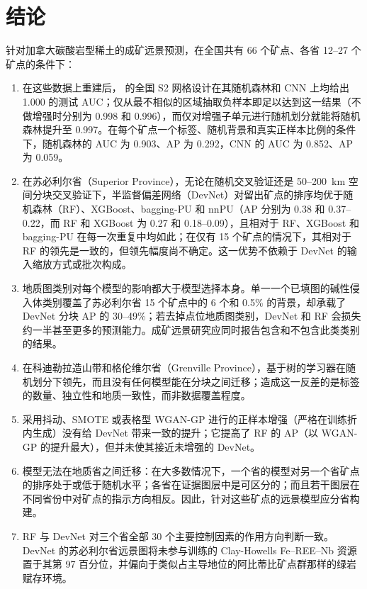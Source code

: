 \documentclass[pdflatex,sn-apa]{sn-jnl}
\begin{document}
\section{结论}\label{sec:conclusions}

针对加拿大碳酸岩型稀土的成矿远景预测，在全国共有 66 个矿点、各省 12--27 个矿点的条件下：
\begin{enumerate}
\item 在这些数据上重建后，\citet{Parsa2024} 的全国 S2 网格设计在其随机森林和 CNN 上均给出 1.000 的测试 AUC；仅从最不相似的区域抽取负样本即足以达到这一结果（不做增强时分别为 0.998 和 0.996），而仅对增强子单元进行随机划分就能将随机森林提升至 0.997。在每个矿点一个标签、随机背景和真实正样本比例的条件下，随机森林的 AUC 为 0.903、AP 为 0.292，CNN 的 AUC 为 0.852、AP 为 0.059。
\item 在苏必利尔省（Superior Province），无论在随机交叉验证还是 50--200~km 空间分块交叉验证下，半监督偏差网络（DevNet）对留出矿点的排序均优于随机森林（RF）、XGBoost、bagging-PU 和 nnPU（AP 分别为 0.38 和 0.37--0.22，而 RF 和 XGBoost 为 0.27 和 0.18--0.09），且相对于 RF、XGBoost 和 bagging-PU 在每一次重复中均如此；在仅有 15 个矿点的情况下，其相对于 RF 的领先是一致的，但领先幅度尚不确定。这一优势不依赖于 DevNet 的输入缩放方式或批次构成。
\item 地质图类别对每个模型的影响都大于模型选择本身。单一一个已填图的碱性侵入体类别覆盖了苏必利尔省 15 个矿点中的 6 个和 0.5\% 的背景，却承载了 DevNet 分块 AP 的 30--49\%；若去掉点位地质图类别，DevNet 和 RF 会损失约一半甚至更多的预测能力。成矿远景研究应同时报告包含和不包含此类类别的结果。
\item 在科迪勒拉造山带和格伦维尔省（Grenville Province），基于树的学习器在随机划分下领先，而且没有任何模型能在分块之间迁移；造成这一反差的是标签的数量、独立性和地质一致性，而非数据覆盖程度。
\item 采用抖动、SMOTE 或表格型 WGAN-GP 进行的正样本增强（严格在训练折内生成）没有给 DevNet 带来一致的提升；它提高了 RF 的 AP（以 WGAN-GP 的提升最大），但并未使其接近未增强的 DevNet。
\item 模型无法在地质省之间迁移：在大多数情况下，一个省的模型对另一个省矿点的排序处于或低于随机水平；各省在证据图层中是可区分的；而且若干图层在不同省份中对矿点的指示方向相反。因此，针对这些矿点的远景模型应分省构建。
\item RF 与 DevNet 对三个省全部 30 个主要控制因素的作用方向判断一致。DevNet 的苏必利尔省远景图将未参与训练的 Clay-Howells Fe--REE--Nb 资源置于其第 97 百分位，并偏向于类似占主导地位的阿比蒂比矿点群那样的绿岩赋存环境。
\end{enumerate}
\end{document}
